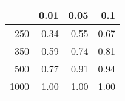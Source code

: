 % 
\begin{tabular}{rrrr}
  \hline
 & 0.01 & 0.05 & 0.1 \\ 
  \hline
250 & 0.34 & 0.55 & 0.67 \\ 
  350 & 0.59 & 0.74 & 0.81 \\ 
  500 & 0.77 & 0.91 & 0.94 \\ 
  1000 & 1.00 & 1.00 & 1.00 \\ 
   \hline
\end{tabular}
